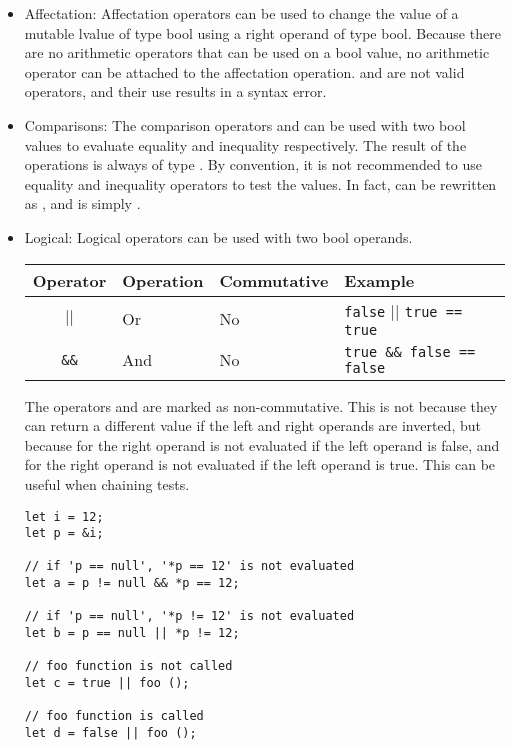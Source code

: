 \begin{itemize}
\item Affectation: Affectation operators can be used to change the value of a
  mutable lvalue of type bool using a right operand of type bool. Because there
  are no arithmetic operators that can be used on a bool value, no arithmetic
  operator can be attached to the affectation operation. \token{\&\&=} and
  \token{||=} are not valid operators, and their use results in a syntax error.

\item Comparisons: The comparison operators \token{==} and \token{!=} can be
  used with two bool values to evaluate equality and inequality respectively.
  The result of the operations is always of type . By convention,
  it is not recommended to use equality and inequality operators to test the
   values. In fact,  can be rewritten as
  , and  is simply .

\item Logical: Logical operators can be used with two bool operands.

  \begin{center}
    \vspace{-20pt}
    \begin{adjustbox}{max width=1.0\linewidth}
      \begin{tabular}{|c|l l l|}
        \hline
        Operator & Operation & Commutative & Example\\[0pt]
        \hline
        \hline
        \texttt{\(\vert\vert\)} & Or & No & \texttt{false} \(\vert{} \vert{}\) \texttt{true == true}\\[0pt]
        \texttt{\&\&} & And & No & \texttt{true \&\& false == false}\\[0pt]
        \hline
      \end{tabular}
    \end{adjustbox}
  \end{center}

  The operators \token{\&\&} and \token{||} are marked as non-commutative. This
  is not because they can return a different value if the left and right operands
  are inverted, but because for \token{\&\&} the right operand is not evaluated
  if the left operand is false, and for \token{||} the right operand is not
  evaluated if the left operand is true. This can be useful when chaining tests.

  \begin{lstlisting}[style=coloredverbatim]
let i = 12;
let p = &i;

// if 'p == null', '*p == 12' is not evaluated
let a = p != null && *p == 12;

// if 'p == null', '*p != 12' is not evaluated
let b = p == null || *p != 12;

// foo function is not called
let c = true || foo ();

// foo function is called
let d = false || foo ();
  \end{lstlisting}
\end{itemize}

